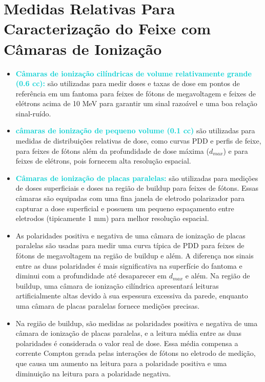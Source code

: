 \documentclass[11pt,a4paper]{article}
\newcounter{exemplo}
\begin{document}
\section{Medidas Relativas Para Caracterização do Feixe com Câmaras de Ionização}
	
\begin{exemplo}
	\begin{itemize}
		\item \textcolor{DarkTurquoise}{\textbf{Câmaras de ionização cilíndricas de volume relativamente grande (0.6 cc):}} são utilizadas para medir doses e taxas de dose em pontos de referência em um fantoma para feixes de fótons de megavoltagem e feixes de elétrons acima de 10 MeV para garantir um sinal razoável e uma boa relação sinal-ruído.

		\item \textcolor{DarkTurquoise}{\textbf{câmaras de ionização de pequeno volume (0.1 cc)}} são utilizadas para medidas de distribuições relativas de dose, como curvas PDD e perfis de feixe, para feixes de fótons além da profundidade de dose máxima ($d_{max}$) e para feixes de elétrons, pois fornecem alta resolução espacial.
		
		\item \textcolor{DarkTurquoise}{\textbf{Câmaras de ionização de placas paralelas:}} são utilizadas para medições de doses superficiais e doses na região de buildup para feixes de fótons. Essas câmaras são equipadas com uma fina janela de eletrodo polarizador para capturar a dose superficial e possuem um pequeno espaçamento entre eletrodos (tipicamente 1 mm) para melhor resolução espacial.
		
		\item As polaridades positiva e negativa de uma câmara de ionização de placas paralelas são usadas para medir uma curva típica de PDD para feixes de fótons de megavoltagem na região de buildup e além. A diferença nos sinais entre as duas polaridades é mais significativa na superfície do fantoma e diminui com a profundidade até desaparecer em $d_{max}$ e além. Na região de buildup, uma câmara de ionização cilíndrica apresentará leituras artificialmente altas devido à sua espessura excessiva da parede, enquanto uma câmara de placas paralelas fornece medições precisas.
		
		\item  Na região de buildup, são medidas as polaridades positiva e negativa de uma câmara de ionização de placas paralelas, e a leitura média entre as duas polaridades é considerada o valor real de dose. Essa média compensa a corrente Compton gerada pelas interações de fótons no eletrodo de medição, que causa um aumento na leitura para a polaridade positiva e uma diminuição na leitura para a polaridade negativa.
		

\end{itemize}
\end{exemplo}
\end{document}

